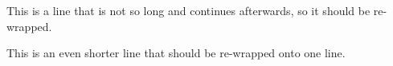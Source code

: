 \documentclass{article}
\begin{document}
This is a line that is not so long
and continues afterwards, so it should be re-wrapped.

This is an even shorter line
that should be re-wrapped onto one line.
\end{document}
